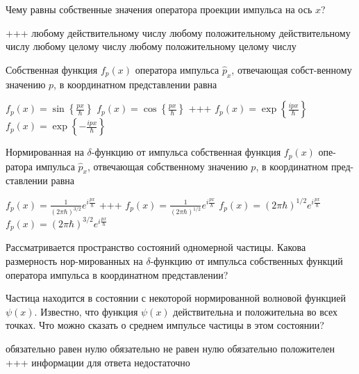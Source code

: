 \documentclass[11pt,a4paper]{exam}
\newcommand{\rightchoice}{\choice +++ }
\begin{document}
\begin{questions}
\question Чему равны собственные значения оператора проекции импульса на ось $x$?
\begin{choices}
\rightchoice любому действительному числу      
\choice любому положительному действительному числу
\choice любому целому числу         
\choice любому положительному целому числу
\end{choices}

\question Собственная функция ${f_p}(x)$ оператора импульса ${\hat p_x}$, отвечающая собст-венному значению $p$, в координатном представлении равна
\begin{choices}
\choice ${f_p}(x) = \sin \left\{ {\frac{{px}}{\hbar }} \right\}$     
\choice ${f_p}(x) = \cos \left\{ {\frac{{px}}{\hbar }} \right\}$
\rightchoice ${f_p}(x) = \exp \left\{ {\frac{{ipx}}{\hbar }} \right\}$    
\choice ${f_p}(x) = \exp \left\{ { - \frac{{ipx}}{\hbar }} \right\}$
\end{choices}

\question Нормированная на $\delta $-функцию от импульса собственная функция ${f_p}(x)$ опе-ратора импульса ${\hat p_x}$, отвечающая собственному значению $p$, в координатном пред-ставлении равна
\begin{choices}
\choice ${f_p}(x) = \frac{1}{{{{(2\pi \hbar )}^{3/2}}}}{e^{i\frac{{px}}{\hbar }}}$
\rightchoice ${f_p}(x) = \frac{1}{{{{(2\pi \hbar )}^{1/2}}}}{e^{i\frac{{px}}{\hbar }}}$
\choice ${f_p}(x) = {(2\pi \hbar )^{1/2}}{e^{i\frac{{px}}{\hbar }}}$    
\choice ${f_p}(x) = {(2\pi \hbar )^{3/2}}{e^{i\frac{{px}}{\hbar }}}$
\end{choices}

\question Рассматривается пространство состояний одномерной частицы. Какова размерность нор-мированных на $\delta $-функцию от импульса собственных функций оператора импульса в координатном представлении?
\begin{choices}
\choice        
\choice 
\choice     
\choice 
\end{choices}

\question Частица находится в состоянии с некоторой нормированной волновой функцией $\psi (x)$. Известно, что функция $\psi (x)$ действительна и положительна во всех точках. Что можно сказать о среднем импульсе частицы в этом состоянии?
\begin{choices}
\choice обязательно равен нулю         
\choice обязательно не равен нулю
\choice обязательно положителен     
\rightchoice информации для ответа недостаточно
\end{choices}


\end{questions}
\end{document}

